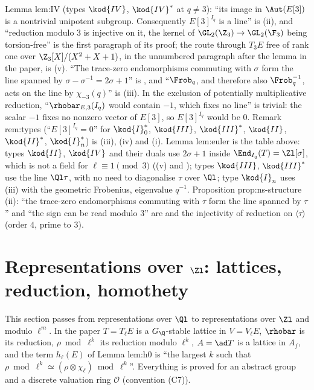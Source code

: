 \begin{paperlink}
Lemma lem:IV (types $\kod{IV}$, $\kod{IV}^*$ at $q\ne3$): ``its image in $\Aut(E[3])$ is a nontrivial unipotent subgroup. Consequently $E[3]^{I_q}$ is a
line'' is (ii), and ``reduction modulo $3$ is injective on it, the kernel of $\GL_2(\Z_3)\to\GL_2(\F_3)$ being
torsion-free'' is the first paragraph of its proof; the route through $T_3E$ free of rank one over $\Z_3[X]/(X^2+X+1)$, in the unnumbered paragraph after the lemma in the paper, is (v). ``The trace-zero
endomorphisms commuting with $\sigma$ form the line spanned by $\sigma-\sigma^{-1}=2\sigma+1$'' is , and ``$\Frob_q$, and therefore also
$\Frob_q^{-1}$, acts on the line by $\chi_{-3}(q)$'' is (iii). In the exclusion of potentially multiplicative reduction,
``$\rhobar_{E,3}(I_q)$ would contain $-1$, which fixes no line'' is trivial: the scalar $-1$ fixes no nonzero vector of $E[3]$, so $E[3]^{I_q}$ would be $0$. Remark rem:types (``$E[3]^{I_q}=0$''
for $\kod{I}_0^*$, $\kod{III}$, $\kod{III}^*$, $\kod{II}$, $\kod{II}^*$, $\kod{I}_n^*$) is (iii), (iv) and (i). Lemma lem:euler is the
table above: types $\kod{II}$, $\kod{IV}$ and their duals use $2\sigma+1$ inside $\End_{I_q}(T)=\Zl[\sigma]$, which is not a field for $\ell\equiv1\pmod3$ ((v) and
); types $\kod{III}$, $\kod{III}^*$ use the line $\Ql\tau$, with no need to diagonalise $\tau$ over $\Ql$; type $\kod{I}_n$ uses
(iii) with the geometric Frobenius, eigenvalue $q^{-1}$. Proposition prop:ns-structure (ii): ``the trace-zero
endomorphisms commuting with $\tau$ form the line spanned by $\tau$'' and ``the sign can be read modulo $3$'' are  and the
injectivity of reduction on $\langle\tau\rangle$ (order $4$, prime to $3$).
\end{paperlink}

\section{Representations over \texorpdfstring{$\Zl$}{Zl}: lattices, reduction, homothety}\label{sec:reps:lattices}

This section passes from representations over $\Ql$ to representations over $\Zl$ and modulo $\ell^m$. In the paper $T=T_\ell E$ is a
$G_\Q$-stable lattice in $V=V_\ell E$, $\rhobar$ is its reduction, $\rho\bmod\ell^k$ its reduction modulo $\ell^k$, $A=\ad T$ is a lattice in $A_f$, and the
term $h_\ell(E)$ of Lemma lem:h0 is ``the largest $k$ such that $\rho\bmod\ell^k\simeq(\rho\otimes\chi_\ell)\bmod\ell^k$''. Everything is proved for an abstract
group and a discrete valuation ring $\mathcal{O}$ (convention (C7)).

